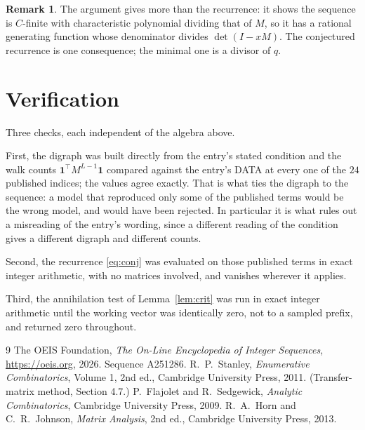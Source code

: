 \documentclass[11pt,a4paper]{article}
\theoremstyle{plain}
\theoremstyle{definition}
\newtheorem{remark}[theorem]{Remark}
\begin{document}
\begin{remark}
The argument gives more than the recurrence: it shows the sequence is $C$-finite with
characteristic polynomial dividing that of $M$, so it has a rational generating function
whose denominator divides $\det(I-xM)$. The conjectured recurrence is one consequence; the
minimal one is a divisor of $q$.
\end{remark}

\section{Verification}

Three checks, each independent of the algebra above.

First, the digraph was built directly from the entry's stated condition and the walk counts
$\mathbf{1}^{\!\top}M^{L-1}\mathbf{1}$ compared against the entry's DATA at
every one of the $24$ published indices; the values agree exactly. That is what ties
the digraph to the sequence: a model that reproduced only some of the published terms would
be the wrong model, and would have been rejected. In particular it is what rules out a
misreading of the entry's wording, since a different reading of the condition gives a
different digraph and different counts.

Second, the recurrence \eqref{eq:conj} was evaluated on those published terms in exact
integer arithmetic, with no matrices involved, and vanishes wherever it applies.

Third, the annihilation test of Lemma~\ref{lem:crit} was run in exact integer arithmetic
until the working vector was identically zero, not to a sampled prefix, and returned zero
throughout.

\begin{thebibliography}{9}
 The OEIS Foundation, \emph{The On-Line Encyclopedia of Integer
Sequences}, \url{https://oeis.org}, 2026. Sequence A251286.
 R.~P.~Stanley, \emph{Enumerative Combinatorics}, Volume 1, 2nd ed.,
Cambridge University Press, 2011. (Transfer-matrix method, Section 4.7.)
 P.~Flajolet and R.~Sedgewick, \emph{Analytic Combinatorics}, Cambridge
University Press, 2009.
 R.~A.~Horn and C.~R.~Johnson, \emph{Matrix Analysis}, 2nd ed., Cambridge
University Press, 2013.
\end{thebibliography}
\end{document}
